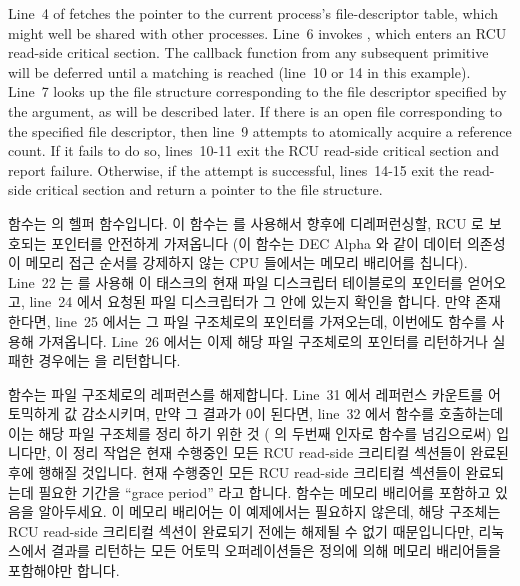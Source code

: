 Line~4 of  fetches the pointer to the current
process's file-descriptor table, which might well be shared
with other processes.
Line~6 invokes , which
enters an RCU read-side critical section.
The callback function from any subsequent  primitive
will be deferred until a matching  is reached
(line~10 or 14 in this example).
Line~7 looks up the file structure corresponding to the file
descriptor specified by the  argument, as will be
described later.
If there is an open file corresponding to the specified file descriptor,
then line~9 attempts to atomically acquire a reference count.
If it fails to do so, lines~10-11 exit the RCU read-side critical
section and report failure.
Otherwise, if the attempt is successful, lines~14-15 exit the read-side
critical section and return a pointer to the file structure.
\fi

 함수는  의 헬퍼 함수입니다.
이 함수는  를 사용해서 향후에 디레퍼런싱할, RCU 로
보호되는 포인터를 안전하게 가져옵니다 (이 함수는 DEC Alpha 와 같이 데이터
의존성이 메모리 접근 순서를 강제하지 않는 CPU 들에서는 메모리 배리어를 칩니다).
Line~22 는  를 사용해 이 태스크의 현재 파일 디스크립터
테이블로의 포인터를 얻어오고, line~24 에서 요청된 파일 디스크립터가 그 안에
있는지 확인을 합니다.
만약 존재한다면, line~25 에서는 그 파일 구조체로의 포인터를 가져오는데,
이번에도  함수를 사용해 가져옵니다.
Line~26 에서는 이제 해당 파일 구조체로의 포인터를 리턴하거나 실패한 경우에는
 을 리턴합니다.

 함수는 파일 구조체로의 레퍼런스를 해제합니다.
Line~31 에서 레퍼런스 카운트를 어토믹하게 값 감소시키며, 만약 그 결과가 0이
된다면, line~32 에서  함수를 호출하는데 이는 해당 파일 구조체를
정리 하기 위한 것 ( 의 두번째 인자로  함수를
넘김으로써) 입니다만, 이 정리 작업은 현재 수행중인 모든 RCU read-side 크리티컬
섹션들이 완료된 후에 행해질 것입니다.
현재 수행중인 모든 RCU read-side 크리티컬 섹션들이 완료되는데 필요한 기간을
``grace period'' 라고 합니다.
 함수는 메모리 배리어를 포함하고 있음을 알아두세요.
이 메모리 배리어는 이 예제에서는 필요하지 않은데, 해당 구조체는 RCU read-side
크리티컬 섹션이 완료되기 전에는 해제될 수 없기 때문입니다만, 리눅스에서 결과를
리턴하는 모든 어토믹 오퍼레이션들은 정의에 의해 메모리 배리어들을 포함해야만
합니다.

